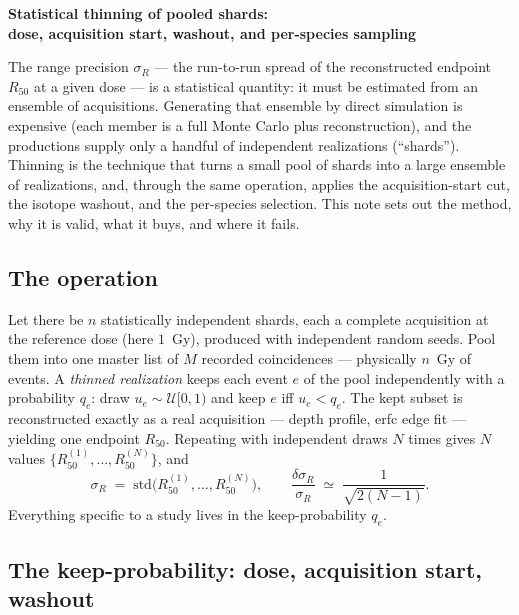 \documentclass[11pt]{article}
\begin{document}
\begin{center}
  {\large\textbf{Statistical thinning of pooled shards:}}\\[2pt]
  {\large\textbf{dose, acquisition start, washout, and per-species sampling}}
\end{center}
\medskip

\noindent
The range precision $\sigma_R$ --- the run-to-run spread of the reconstructed
endpoint $R_{50}$ at a given dose --- is a statistical quantity: it must be
estimated from an ensemble of acquisitions. Generating that ensemble by direct
simulation is expensive (each member is a full Monte Carlo plus reconstruction),
and the productions supply only a handful of independent realizations
(``shards''). Thinning is the technique that turns a small pool of shards into a
large ensemble of realizations, and, through the same operation, applies the
acquisition-start cut, the isotope washout, and the per-species selection. This
note sets out the method, why it is valid, what it buys, and where it fails.

\subsection*{The operation}

Let there be $n$ statistically independent shards, each a complete acquisition at
the reference dose (here $1$~Gy), produced with independent random seeds. Pool
them into one master list of $M$ recorded coincidences --- physically $n$~Gy of
events. A \emph{thinned realization} keeps each event $e$ of the pool
independently with a probability $q_e$: draw $u_e\sim\mathcal{U}[0,1)$ and keep
$e$ iff $u_e<q_e$. The kept subset is reconstructed exactly as a real
acquisition --- depth profile, erfc edge fit --- yielding one endpoint $R_{50}$.
Repeating with independent draws $N$ times gives $N$ values $\{R_{50}^{(1)},\dots,
R_{50}^{(N)}\}$, and
%
\begin{equation}
  \sigma_R \;=\; \mathrm{std}\bigl(R_{50}^{(1)},\dots,R_{50}^{(N)}\bigr),
  \qquad
  \frac{\delta\sigma_R}{\sigma_R}\;\simeq\;\frac{1}{\sqrt{2(N-1)}}.
  \label{eq:sigmaR}
\end{equation}
%
Everything specific to a study lives in the keep-probability $q_e$.

\subsection*{The keep-probability: dose, acquisition start, washout}
\end{document}
